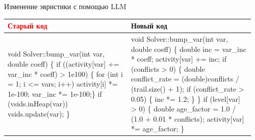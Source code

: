 \documentclass[final]{beamer}
\newlength{\colwidth}
\begin{document}
\begin{frame}[t]
\begin{columns}[t]
\begin{column}{\colwidth}
\begin{block}{Изменение эвристики с помощью LLM}
\footnotesize\ttfamily
\begin{tabular}{@{} p{0.48\linewidth} | p{0.48\linewidth} @{}}
\centering\textbf{\textsf{\textcolor{red}{Старый код}}} & \centering\textbf{\textsf{\textcolor{green!60!black}{Новый код}}} \tabularnewline
\hline
\vspace{0.2em}
void Solver::bump\_var(int var, double coeff) \{ \newline
\hspace*{2em}if ((activity[var] += var\_inc * coeff) > 1e100) \{ \newline
\hspace*{4em}for (int i = 1; i <= vars; i++) activity[i] *= 1e-100; \newline
\hspace*{4em}var\_inc *= 1e-100;\} \newline
\hspace*{2em}if (vsids.inHeap(var)) vsids.update(var); \newline
\}
&
\vspace{0.2em}
void Solver::bump\_var(int var, double coeff) \{ \newline
\hspace*{2em}double inc = var\_inc * coeff; \newline
\hspace*{2em}activity[var] += inc; \newline
\hspace*{2em}if (conflicts > 0) \{ \newline
\hspace*{4em}double conflict\_rate = (double)conflicts / (trail.size() + 1); \newline
\hspace*{4em}if (conflict\_rate > 0.05) \{ \newline
\hspace*{6em}inc *= 1.2; \newline
\hspace*{4em}\} \newline
\hspace*{2em}\} \newline
\hspace*{2em}if (level[var] > 0) \{ \newline
\hspace*{4em}double age\_factor = 1.0 / (1.0 + 0.01 * conflicts); \newline
\hspace*{4em}activity[var] *= age\_factor; \newline
\hspace*{2em}\} \newline

\end{tabular}
\end{block}
\end{column}
\end{columns}
\end{frame}
\end{document}
